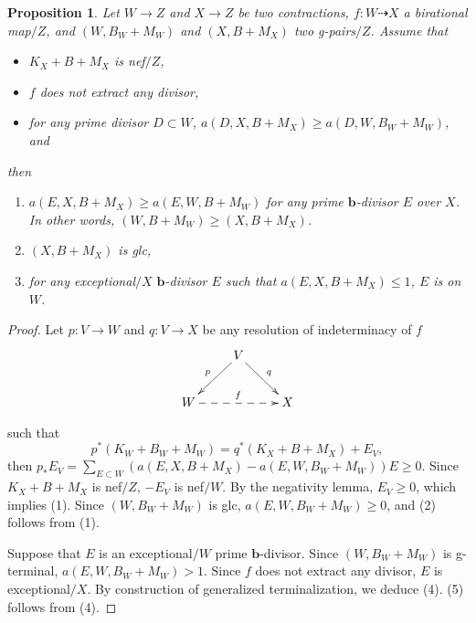 \documentclass[11pt]{amsart}
\numberwithin{equation}{section}
\newcommand{\bb}{\bm{b}}
\newtheorem{prop}[thm]{Proposition}
\theoremstyle{definition}
\theoremstyle{definition}
\theoremstyle{definition}
\begin{document}
\begin{prop}\label{prop: g terminalization prop} 
Let $W\rightarrow Z$ and $X\rightarrow Z$ be two contractions, $f:W\dashrightarrow X$ a birational map$/Z$, and $(W,B_W+M_W)$ and $(X,B+M_X)$ two g-pairs$/Z$. Assume that
\begin{itemize}
    \item $K_X+B+M_X$ is nef$/Z$,
    \item $f$ does not extract any divisor,
    \item for any prime divisor $D\subset W$, $a(D,X,B+M_X)\geq a(D,W,B_W+M_W)$, and
\end{itemize}
then
\begin{enumerate}
    \item $a(E,X,B+M_X)\geq a(E,W,B+M_W)$ for any prime $\bb$-divisor $E$ over $X$. In other words, $(W,B+M_W)\geq (X,B+M_X)$.
    \item $(X,B+M_X)$ is glc,
    \item for any exceptional$/X$ $\bb$-divisor $E$ such that $a(E,X,B+M_X)\leq 1$, $E$ is on $W$.
\end{enumerate}
\end{prop}
\begin{proof}
Let 
$p: V\rightarrow W$ and $q: V\rightarrow X$ be any resolution of indeterminacy of $f$ 
\[
  \xymatrix{
 & V\ar@{->}[dl]_{p}\ar@{->}[dr]^{q}& \\
      W\ar@{-->}[rr]^{f}   &  & X \\
    }
\]


such that
$$p^*(K_W+B_W+M_W)=q^*(K_X+B+M_X)+E_V,$$
then $p_*E_V=\sum_{E\subset W}(a(E,X,B+M_X)-a(E,W,B_W+M_W))E\geq 0$. Since $K_X+B+M_X$ is nef$/Z$, $-E_V$ is nef$/W$. By the negativity lemma, $E_V\geq 0$, which implies (1). 
Since $(W,B_W+M_W)$ is glc, $a(E,W,B_W+M_W) \geqslant 0 $, and (2) follows from (1).  

Suppose that $E$ is an exceptional$/W$ prime $\bb$-divisor. Since $(W,B_W+M_W)$ is g-terminal, $a(E,W,B_W+M_W)>1$. Since $f$ does not extract any divisor, $E$ is exceptional$/X$. By construction of generalized terminalization, we deduce (4). (5) follows from (4).
\end{proof}
\end{document}
